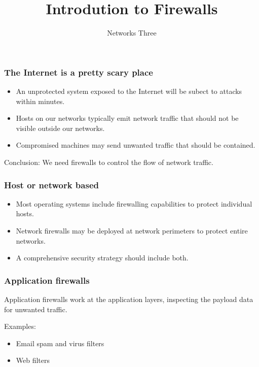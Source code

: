 \documentclass[10pt]{beamer}
\title{Introdution to Firewalls}
\author[IN715]{Networks Three}
\institute[Otago Polytechnic]{
  Otago Polytechnic \\
  Dunedin, New Zealand \\
}
\date{}
\begin{document}
\begin{frame}[plain]
  \titlepage
\end{frame}


\begin{frame}
  \frametitle{The Internet is a pretty scary place}

 \begin{itemize}
  \item An unprotected system exposed to the Internet will be subect to attacks within minutes.
  \item Hosts on our networks typically emit network traffic that should not be visible outside 
	  our networks.
  \item Compromised machines may send unwanted traffic that should be contained.
 \end{itemize}
 
 Conclusion:  We need firewalls to control the flow of network traffic.
\end{frame}


\begin{frame}
  \frametitle{Host or network based}

 \begin{itemize}
	 \item Most operating systems include firewalling capabilities to protect individual hosts.
	 \item Network firewalls may be deployed at network perimeters to protect entire networks.
	 \item A comprehensive security strategy should include both.
 \end{itemize}

\end{frame}


\begin{frame}
  \frametitle{Application firewalls}

 Application firewalls work at the application layers, inspecting the payload data
 for unwanted traffic.

 Examples:
 \begin{itemize}
	 \item Email spam and virus filters
	 \item Web filters
 \end{itemize}

\end{frame}
\end{document}
